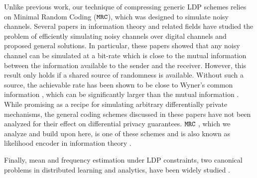 Unlike previous work, our technique of compressing generic LDP schemes relies on Minimal Random Coding ($\texttt{MRC}$), which was designed to simulate noisy channels. Several papers in information theory and related fields have studied the problem of efficiently simulating noisy channels over digital channels \cite[e.g.,][]{BS02,HJMR07,LE18} and proposed general solutions. In particular, these papers showed that any noisy channel can be simulated at a bit-rate which is close to the mutual information between the information available to the sender and the receiver. However, this result only holds if a shared source of randomness is available. Without such a source, the achievable rate has been shown to be close to Wyner's common information \citep{W75,C08}, which can be significantly larger than the mutual information \citep{XLC11}. While promising as a recipe for simulating arbitrary differentially private mechanisms, the general coding schemes discussed in these papers have not been analyzed for their effect on differential privacy guarantees. $\texttt{MRC}$ \citep{HPHJ19}, which we analyze and build upon here, is one of these schemes and is also known as likelihood encoder in information theory \citep{C08,SCV16}. 

Finally, mean and frequency estimation under LDP constraints, two canonical problems in distributed learning and analytics, have been widely studied \citep{duchi2013local, nguyn2016collecting, BDFKR2018, wang2019locally, g2019vqsgd, erlingsson14rappor, BS15, kairouz16discrete, YB18, acharya2019hadamard}.
